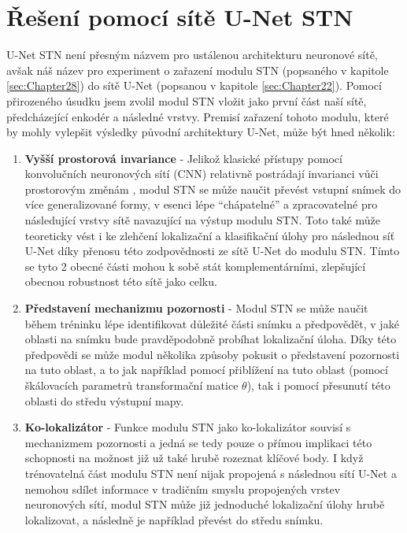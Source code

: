 \section{Řešení pomocí sítě U-Net STN}
\label{sec:Chapter45}
U-Net STN není přesným názvem pro ustálenou architekturu neuronové sítě, avšak náš název pro experiment o zařazení modulu STN (popsaného v kapitole \ref{sec:Chapter28}) do sítě U-Net (popsanou v kapitole \ref{sec:Chapter22}). Pomocí přirozeného úsudku jsem zvolil modul STN vložit jako první část naší sítě, předcházející enkodér a následné vrstvy. Premisí zařazení tohoto modulu, které by mohly vylepšit výsledky původní architektury U-Net, může být hned několik:
\begin{enumerate}
    \item \textbf{Vyšší prostorová invariance} - Jelikož klasické přístupy pomocí konvolučních neuronových sítí (CNN) relativně postrádají invarianci vůči prostorovým změnám \cite{stn}, modul STN se může naučit převést vstupní snímek do více generalizované formy, v esenci lépe \enquote{chápatelné} a zpracovatelné pro následující vrstvy sítě navazující na výstup modulu STN. Toto také může teoreticky vést i ke zlehčení lokalizační a klasifikační úlohy pro následnou síť U-Net díky přenosu této zodpovědnosti ze sítě U-Net do modulu STN. Tímto se tyto 2 obecné části mohou k sobě stát komplementárními, zlepšující obecnou robustnost této sítě jako celku.
    \item \textbf{Představení mechanizmu pozornosti} - Modul STN se může naučit během tréninku lépe identifikovat důležité části snímku a předpovědět, v jaké oblasti na snímku bude pravděpodobně probíhat lokalizační úloha. Díky této předpovědi se může modul několika způsoby pokusit o představení pozornosti na tuto oblast, a to jak například pomocí přiblížení na tuto oblast (pomocí škálovacích parametrů transformační matice $\theta$), tak i pomocí přesunutí této oblasti do středu výstupní mapy.
    \item \textbf{Ko-lokalizátor} - Funkce modulu STN jako ko-lokalizátor souvisí s mechanizmem pozornosti a jedná se tedy pouze o přímou implikaci této schopnosti na možnost již už také hrubě rozeznat klíčové body. I když trénovatelná část modulu STN není nijak propojená s následnou sítí U-Net a nemohou sdílet informace v tradičním smyslu propojených vrstev neuronových sítí, modul STN může již jednoduché lokalizační úlohy hrubě lokalizovat, a následně je například převést do středu snímku.
\end{enumerate}

